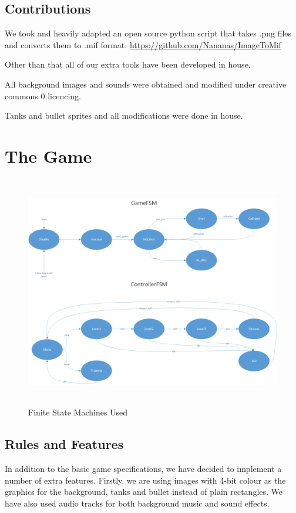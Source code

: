 \documentclass{article}
\begin{document}
\subsection{Contributions}

We took and heavily adapted an open source python script that takes .png files and converts them to .mif format. 
\url{https://github.com/Nananas/ImageToMif}

Other than that all of our extra tools have been developed in house.

All background images and sounds were obtained and modified under creative commons 0 licencing.

Tanks and bullet sprites and all modifications were done in house.

\section{The Game}

\begin{figure}[!b]
\centerline{\includegraphics[height=4in]{FSMdiagram}}
\caption{Finite State Machines Used}
\label{fig:fsm}
\end{figure}

\subsection{Rules and Features}

In addition to the basic game specifications, we have decided to implement a number of extra features. Firstly, we are using images with 4-bit colour as the graphics for the background, tanks and bullet instead of plain rectangles. We have also used audio tracks for both background music and sound effects.
\end{document}
